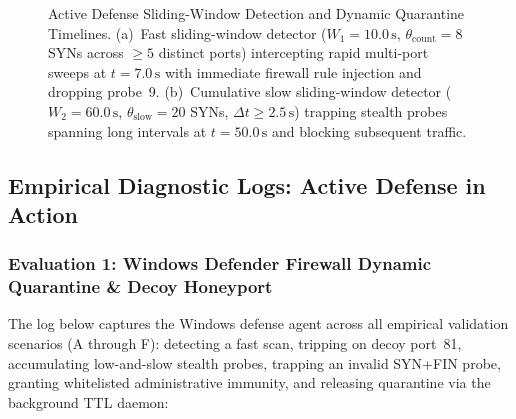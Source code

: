 \begin{figure}[htbp]
\begin{minipage}{\textwidth}
\end{minipage}
\caption{Active Defense Sliding-Window Detection and Dynamic Quarantine Timelines. (a)~Fast sliding-window detector ($W_1 = 10.0\,\text{s}$, $\theta_{\text{count}} = 8$ SYNs across $\ge 5$ distinct ports) intercepting rapid multi-port sweeps at $t=7.0\,\text{s}$ with immediate firewall rule injection and dropping probe~9. (b)~Cumulative slow sliding-window detector ($W_2 = 60.0\,\text{s}$, $\theta_{\text{slow}} = 20$ SYNs, $\Delta t \ge 2.5\,\text{s}$) trapping stealth probes spanning long intervals at $t=50.0\,\text{s}$ and blocking subsequent traffic.}
\label{fig:defense_timelines}
\label{fig:fast_defense}
\label{fig:slow_defense}
\label{fig:timing_defense}
\end{figure}

\FloatBarrier
\subsection{Empirical Diagnostic Logs: Active Defense in Action}

\subsubsection{Evaluation 1: Windows Defender Firewall Dynamic Quarantine \& Decoy Honeyport}
The log below captures the Windows defense agent across all empirical validation scenarios (A through F): detecting a fast scan, tripping on decoy port~81, accumulating low-and-slow stealth probes, trapping an invalid SYN+FIN probe, granting whitelisted administrative immunity, and releasing quarantine via the background TTL daemon:

